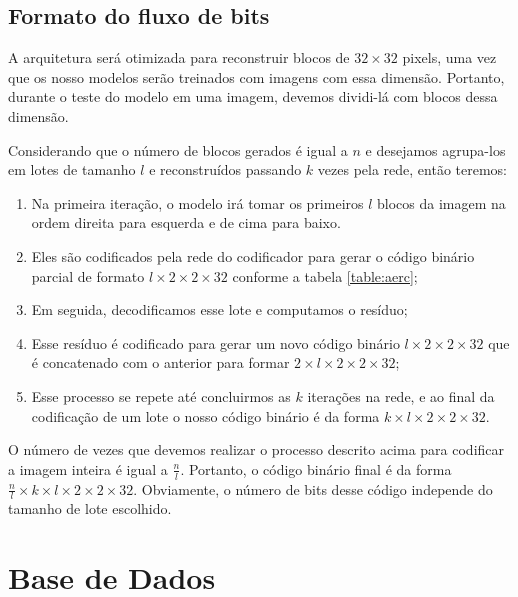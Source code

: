 


\subsection{Formato do fluxo de bits}

A arquitetura será otimizada para reconstruir blocos de $32 \times 32$ pixels, uma vez que os nosso modelos serão treinados com imagens com essa dimensão. Portanto, durante o teste do modelo em uma imagem, devemos dividi-lá com blocos dessa dimensão. 

Considerando que o número de blocos gerados é igual a $n$ e desejamos agrupa-los em lotes de tamanho $l$ e reconstruídos passando $k$ vezes pela rede, então teremos:
\begin{enumerate}
	\item Na primeira iteração, o modelo irá tomar os primeiros $l$ blocos da imagem na ordem direita para esquerda e de cima para baixo. 	\item Eles são codificados pela rede do codificador para gerar o código binário parcial de formato $l \times 2 \times 2 \times 32$ conforme a tabela \ref{table:aerc};
	\item Em seguida, decodificamos esse lote e computamos o resíduo;
	\item  Esse resíduo é codificado para gerar um novo código binário $l \times 2 \times 2 \times 32$ que é concatenado com o anterior para formar $2 \times l \times 2 \times 2 \times 32$;
	\item Esse processo se repete até concluirmos as $k$ iterações na rede, e ao final da codificação de um lote o nosso código binário é da forma $k \times l \times 2 \times 2 \times 32$. 
\end{enumerate}

O número de vezes que devemos realizar o processo descrito acima para codificar a imagem inteira é igual a $\frac{n}{l}$. Portanto, o código binário final é da forma $\frac{n}{l} \times k \times l \times 2 \times 2 \times 32$. Obviamente, o número de bits desse código independe do tamanho de lote escolhido. 


\section {Base de Dados}

